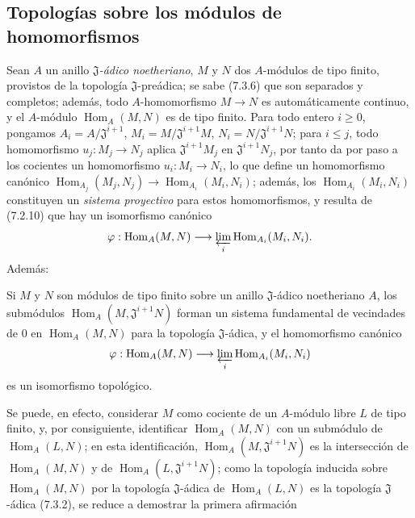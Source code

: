 \subsection{Topologías sobre los módulos de homomorfismos}
\label{subsection:0.7.8-fr}

\begin{env}[7.8.1]
\label{0.7.8.1-fr}
Sean $A$ un anillo \emph{$\mathfrak J$-ádico noetheriano}, $M$ y $N$ dos
$A$-módulos de tipo finito, provistos de la topología $\mathfrak J$-preádica;
se sabe (7.3.6) que son separados y completos; además, todo
$A$-homomorfismo $M\to N$ es automáticamente continuo, y el $A$-módulo
$\operatorname{Hom}_A(M,N)$ es de tipo finito. Para todo entero $i\geq 0$, pongamos
$A_i=A/\mathfrak J^{i+1}$, $M_i=M/\mathfrak J^{i+1}M$,
$N_i=N/\mathfrak J^{i+1}N$; para $i\leq j$, todo homomorfismo
$u_j:M_j\to N_j$ aplica $\mathfrak J^{i+1}M_j$ en
$\mathfrak J^{i+1}N_j$, por tanto da por paso a los cocientes un
homomorfismo $u_i:M_i\to N_i$, lo que define un homomorfismo canónico
$\operatorname{Hom}_{A_j}(M_j,N_j)\to\operatorname{Hom}_{A_i}(M_i,N_i)$; además, los
$\operatorname{Hom}_{A_i}(M_i,N_i)$ constituyen un \emph{sistema proyectivo} para estos
homomorfismos, y resulta de (7.2.10) que hay un isomorfismo
canónico
\[
  \varphi:\operatorname{Hom}_A(M,N)\longrightarrow
  \varprojlim_i\operatorname{Hom}_{A_i}(M_i,N_i).
\]
Además:
\end{env}

\begin{proposition}[7.8.2]
\label{0.7.8.2-fr}
Si $M$ y $N$ son módulos de tipo finito sobre un anillo $\mathfrak J$-ádico
noetheriano $A$, los submódulos $\operatorname{Hom}_A(M,\mathfrak J^{i+1}N)$ forman un
sistema fundamental de vecindades de $0$ en $\operatorname{Hom}_A(M,N)$ para la
topología $\mathfrak J$-ádica, y el homomorfismo canónico
\[
  \varphi:\operatorname{Hom}_A(M,N)\longrightarrow
  \varprojlim_i\operatorname{Hom}_{A_i}(M_i,N_i)
\]
es un isomorfismo topológico.
\end{proposition}

Se puede, en efecto, considerar $M$ como cociente de un $A$-módulo libre $L$ de
tipo finito, y, por consiguiente, identificar $\operatorname{Hom}_A(M,N)$ con un submódulo de
$\operatorname{Hom}_A(L,N)$; en esta identificación,
$\operatorname{Hom}_A(M,\mathfrak J^{i+1}N)$ es la intersección de $\operatorname{Hom}_A(M,N)$ y de
$\operatorname{Hom}_A(L,\mathfrak J^{i+1}N)$; como la topología inducida sobre
$\operatorname{Hom}_A(M,N)$ por la topología $\mathfrak J$-ádica de $\operatorname{Hom}_A(L,N)$ es
la topología $\mathfrak J$-ádica (7.3.2), se reduce a demostrar la
primera afirmación

